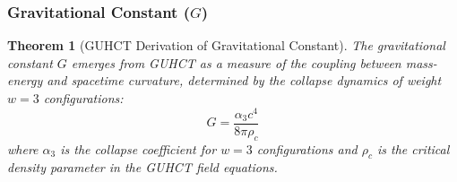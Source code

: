 \documentclass[11pt,a4paper]{article}
\newtheorem{theorem}{Theorem}[section]
\begin{document}
\subsubsection{Gravitational Constant ($G$)}
\label{ssubsec:gravitational_constant}

\begin{theorem}[GUHCT Derivation of Gravitational Constant]
\label{thm:gravitational_constant}
The gravitational constant $G$ emerges from GUHCT as a measure of the coupling between mass-energy and spacetime curvature, determined by the collapse dynamics of weight $w=3$ configurations:
\begin{equation}
G = \frac{\alpha_3 c^4}{8\pi \rho_c}
\label{eq:G_def} %
\end{equation}
where $\alpha_3$ is the collapse coefficient for $w=3$ configurations and $\rho_c$ is the critical density parameter in the GUHCT field equations.
\end{theorem}
\end{document}
